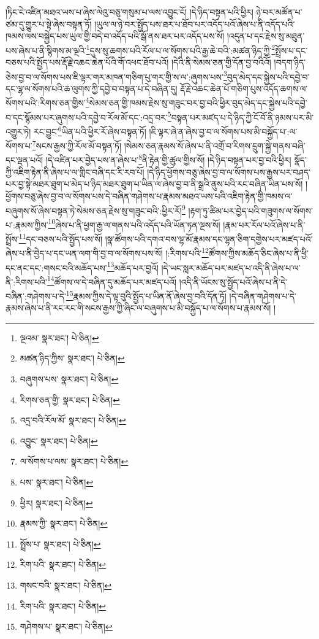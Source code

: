 །ཏིང་ངེ་འཛིན་མཐའ་ཡས་པ་ཞེས་ལེའུ་བཅུ་གསུམ་པ་ལས་འབྱུང་ངོ། །དེ་ཉིད་བསྟན་པའི་ཕྱིར། ཉེ་བར་མཚོན་པ་ཙམ་དུ་གྱུར་པ་སྟེ་ཞེས་བསྟན་ཏོ། །ཡུལ་ལ་ཉེ་བར་སྤྱོད་པས་ཐར་པ་ཐོབ་པར་འདོད་པའོ་ཞེས་པ་ནི་འདོད་པའི་ཁམས་ལས་བསྐྱེད་པས་ཡུལ་གྱི་བདེ་བ་འདོད་པའི་སྒོ་ནས་ཐར་པར་འདོད་པས་སོ། །འདུན་པ་དང་རྗེས་སུ་མཐུན་པས་ཞེས་པ་ནི་སྙིགས་མ་ལྔའི་\footnote{ལྔའམ་  སྣར་ཐང་།  པེ་ཅིན། }དུས་སུ་ཆགས་པའི་རོལ་པ་ལ་སོགས་པའི་རྒྱ་ཆེ་བའི་:མཚན་ཉིད་ཀྱི་\footnote{མཚན་ཉིད་ཀྱིས་  སྣར་ཐང་།  པེ་ཅིན། }སྤྲོས་པ་དང་བཅས་པའི་སྤྱོད་པས་རྡོ་རྗེ་འཆང་ཆེན་པོའི་གོ་འཕང་ཐོབ་པའོ། །དེའི་ནི་སེམས་ཅན་གྱི་དོན་བྱ་བའིའོ། །བདག་ཉིད་ཅེས་བྱ་བ་ལ་སོགས་པས་ཇི་ལྟར་གར་མཁན་གཅིག་པུ་གར་གྱི་ས་ལ་:ཞུགས་པས་\footnote{བཞུགས་པས་  སྣར་ཐང་།  པེ་ཅིན། }བུད་མེད་དང་སྐྱེས་པའི་དབྱེ་བ་དང་ལྷ་ལ་སོགས་པའི་ཆ་ལུགས་ཀྱི་དབྱེ་བ་བསྟན་པ་དེ་བཞིན་དུ། རྡོ་རྗེ་འཆང་ཆེན་པོ་གཅིག་པུས་འདོད་ཆགས་ལ་སོགས་པའི་:རིགས་ཅན་གྱིས་\footnote{རིགས་ཅན་གྱི་  སྣར་ཐང་།  པེ་ཅིན། }སེམས་ཅན་གྱི་ཁམས་རྗེས་སུ་གཟུང་བར་བྱ་བའི་ཕྱིར་བུད་མེད་དང་སྐྱེས་པའི་དབྱེ་བ་དང་སྙོམས་པར་ཞུགས་པའི་དབྱེ་བ་རོལ་མོ་དང་:འདྲ་བར་\footnote{འདྲ་བའི་རོལ་མོ་  སྣར་ཐང་།  པེ་ཅིན། }བསྟན་པར་མཛད་པ་དེ་ཉིད་ཀྱི་ངོ་བོ་ནི་ཉམས་པར་མི་འགྱུར་ཏེ། རང་བྱུང་\footnote{འབྱུང་  སྣར་ཐང་།  པེ་ཅིན། }ཡིན་པའི་ཕྱིར་རོ་ཞེས་བསྟན་ཏོ། །ཇི་ལྟར་ཞེ་ན་ཞེས་བྱ་བ་ལ་སོགས་པས་མི་བསྐྱོད་པ་:ལ་སོགས་པ་\footnote{ལ་སོགས་པ་ལས་  སྣར་ཐང་།  པེ་ཅིན། }སངས་རྒྱས་ཀྱི་རོལ་མོ་བསྟན་ཏོ། །སེམས་ཅན་རྣམས་སོ་ཞེས་པ་ནི་འགྲོ་བ་རིགས་དྲུག་སྐྱེ་གནས་བཞི་དང་ལྡན་པའོ། །དེ་འཛིན་པར་བྱེད་པས་ན་ཞེས་པ་\footnote{པས་  སྣར་ཐང་།  པེ་ཅིན། }ནི་རྟེན་གྱི་ཚུལ་གྱིས་སོ། །དེ་ཉིད་བསྟན་པར་བྱ་བའི་ཕྱིར། སྣོད་ཀྱི་འཇིག་རྟེན་ནི་ཞེས་པ་ལ་གླིང་བཞི་དང་རི་རབ་པོ། །དེ་ཉིད་ཕྱོགས་བཅུ་ཞེས་བྱ་བ་ལ་སོགས་པས་རྒྱས་པར་བཤད་པར་བྱ་སྟེ་མཐར་ཐུག་པ་མེད་པ་ཉིད་མཐར་ཐུག་པ་ཡིན་ལ་ཞེས་བྱ་བ་ནི་སྒྲའི་ནུས་པའི་རང་བཞིན་ཡིན་པས་སོ། །ཕྱོགས་བཅུ་ཞེས་བྱ་བ་ལ་སོགས་པས་དེ་བཞིན་གཤེགས་པ་རྣམས་མཐའ་ཡས་པའི་འཇིག་རྟེན་གྱི་ཁམས་ལ་བཞུགས་སོ་ཞེས་བསྟན་ཏེ་སེམས་ཅན་རྗེས་སུ་གཟུང་བའི་:ཕྱིར་རོ།\footnote{ཕྱིར།  སྣར་ཐང་།  པེ་ཅིན། } །རྟག་ཏུ་ཚིམ་པར་བྱེད་པའི་གཟུགས་ལ་སོགས་པ་:རྣམས་ཀྱིས་\footnote{རྣམས་ཀྱི་  སྣར་ཐང་།  པེ་ཅིན། }ཞེས་པ་ནི་ཕྱག་རྒྱ་ལ་གནས་པའི་འདོད་པའི་ཡོན་ཏན་ལྔས་སོ། །རྣམ་པར་རོལ་པའོ་ཞེས་པ་ནི་སྤྲོས་\footnote{སྤྲོས་པ་  སྣར་ཐང་།  པེ་ཅིན། }དང་བཅས་པའི་སྤྱོད་པས་སོ། །སྣ་ཚོགས་པའི་དགའ་བས་ལྷ་མོ་རྣམས་དང་ལྷན་ཅིག་དགྱེས་པར་མཛད་པའོ་ཞེས་པ་ནི་བྱེད་པ་དང་ཡན་ལག་གི་བྱ་བ་ལ་སོགས་པས་སོ། །:རིགས་པའི་\footnote{རིག་པའི་  སྣར་ཐང་།  པེ་ཅིན། }ཚོགས་ཀྱིས་མཆོད་ཅིང་ཞེས་པ་ནི་ཕྱི་དང་ནང་དང་:གསང་བའི་མཆོད་པས་\footnote{གསང་བའི་  སྣར་ཐང་།  པེ་ཅིན། }མཆོད་པར་བྱའོ། །དེ་ཡང་སླར་མཆོད་པར་མཛད་པ་འདི་ནི་ཞེས་པ་ལ་ནི་:རིགས་པའི་\footnote{རིག་པའི་  སྣར་ཐང་།  པེ་ཅིན། }ཚོགས་ལ་དེ་བཞིན་དུ་མཆོད་པར་མཛད་པའོ། །འདི་ནི་ཡོངས་སུ་སྤྱོད་པའོ་ཞེས་པ་ནི་དེ་བཞིན་:གཤེགས་པ་དེ་\footnote{གཤེགས་པ་  སྣར་ཐང་།  པེ་ཅིན། }རྣམས་ཀྱིས་དེ་ལྟ་བུའི་སྤྱོད་པ་ཡིན་ནོ་ཞེས་བྱ་བའི་དོན་ཏོ། །དེ་བཞིན་གཤེགས་པ་དེ་རྣམས་ཞེས་པ་ནི་རང་རང་གི་སངས་རྒྱས་ཀྱི་ཞིང་ལ་བཞུགས་པ་མི་བསྐྱོད་པ་ལ་སོགས་པ་རྣམས་སོ། །

